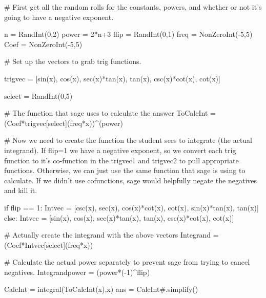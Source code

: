 \begin{sagesilent}
# First get all the random rolls for the constants, powers, and whether or not it's going to have a negative exponent.

n = RandInt(0,2)
power = 2*n+3
flip = RandInt(0,1)
freq = NonZeroInt(-5,5)
Coef = NonZeroInt(-5,5)

# Set up the vectors to grab trig functions.

trigvec = [sin(x), cos(x), sec(x)*tan(x), tan(x), csc(x)*cot(x), cot(x)]

select = RandInt(0,5)

# The function that sage uses to calculate the answer
ToCalcInt = (Coef*trigvec[select](freq*x))^(power)

# Now we need to create the function the student sees to integrate (the actual integrand). If flip=1 we have a negative exponent, so we convert each trig function to it's co-function in the trigvec1 and trigvec2 to pull appropriate functions. Otherwise, we can just use the same function that sage is using to calculate. If we didn't use cofunctions, sage would helpfully negate the negatives and kill it.

if flip == 1:
    Intvec = [csc(x), sec(x), cos(x)*cot(x), cot(x), sin(x)*tan(x), tan(x)]
else:
    Intvec = [sin(x), cos(x), sec(x)*tan(x), tan(x), csc(x)*cot(x), cot(x)]

# Actually create the integrand with the above vectors
Integrand = (Coef*Intvec[select](freq*x))

# Calculate the actual power separately to prevent sage from trying to cancel negatives.
Integrandpower = (power*(-1)^flip)



CalcInt = integral(ToCalcInt(x),x)
ans = CalcInt#.simplify()

\end{sagesilent}




